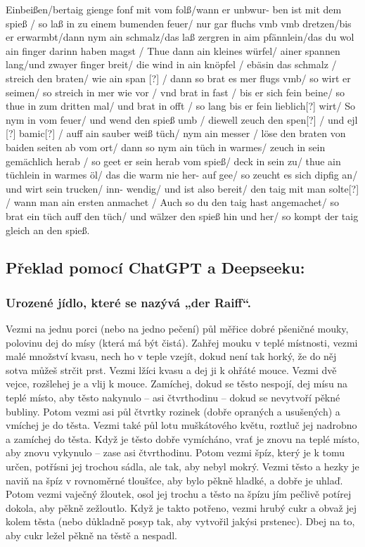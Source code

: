 Einbeißen/bertaig gienge fonf mit vom folß/wann er unbwur- ben ist mit
dem spieß / so laß in zu einem bumenden feuer/ nur gar fluchs vmb vmb
dretzen/bis er erwarmbt/dann nym ain schmalz/das laß zergren in aim
pfännlein/das du wol ain finger darinn haben magst / Thue dann ain
kleines würfel/ ainer spannen lang/und zwayer finger breit/ die wind in
ain knöpfel / ebäsin das schmalz / streich den braten/ wie ain span
{[}?{]} / dann so brat es mer flugs vmb/ so wirt er seimen/ so streich
in mer wie vor / vnd brat in fast / bis er sich fein beine/ so thue in
zum dritten mal/ und brat in offt / so lang bis er fein lieblich{[}?{]}
wirt/ So nym in vom feuer/ und wend den spieß umb / diewell zeuch den
spen{[}?{]} / und ejl {[}?{]} bamic{[}?{]} / auff ain sauber weiß tüch/
nym ain messer / löse den braten von baiden seiten ab vom ort/ dann so
nym ain tüch in warmes/ zeuch in sein gemächlich herab / so geet er sein
herab vom spieß/ deck in sein zu/ thue ain tüchlein in warmes öl/ das
die warm nie her- auf gee/ so zeucht es sich dipfig an/ und wirt sein
trucken/ inn- wendig/ und ist also bereit/ den taig mit man solte{[}?{]}
/ wann man ain ersten anmachet / Auch so du den taig hast angemachet/ so
brat ein tüch auff den tüch/ und wälzer den spieß hin und her/ so kompt
der taig gleich an den spieß.

\subsection{Překlad pomocí ChatGPT a
Deepseeku:}\label{250922-1759}

\subsubsection{Urozené jídlo, které se nazývá „der
Raiff``.}\label{250922-1759}

Vezmi na jednu porci (nebo na jedno pečení) půl měřice dobré pšeničné
mouky, polovinu dej do mísy (která má být čistá). Zahřej mouku v teplé
místnosti, vezmi malé množství kvasu, nech ho v teple vzejít, dokud není
tak horký, že do něj sotva můžeš strčit prst. Vezmi lžíci kvasu a dej ji
k ohřáté mouce. Vezmi dvě vejce, rozšlehej je a vlij k mouce. Zamíchej,
dokud se těsto nespojí, dej mísu na teplé místo, aby těsto nakynulo --
asi čtvrthodinu -- dokud se nevytvoří pěkné bubliny. Potom vezmi asi půl
čtvrtky rozinek (dobře opraných a usušených) a vmíchej je do těsta.
Vezmi také půl lotu muškátového květu, roztluč jej nadrobno a zamíchej
do těsta. Když je těsto dobře vymícháno, vrať je znovu na teplé místo,
aby znovu vykynulo -- zase asi čtvrthodinu. Potom vezmi špíz, který je k
tomu určen, potřísni jej trochou sádla, ale tak, aby nebyl mokrý. Vezmi
těsto a hezky je naviň na špíz v rovnoměrné tloušťce, aby bylo pěkně
hladké, a dobře je uhlaď. Potom vezmi vaječný žloutek, osol jej trochu a
těsto na špízu jím pečlivě potírej dokola, aby pěkně zežloutlo. Když je
takto potřeno, vezmi hrubý cukr a obvaž jej kolem těsta (nebo důkladně
posyp tak, aby vytvořil jakýsi prstenec). Dbej na to, aby cukr ležel
pěkně na těstě a nespadl.

